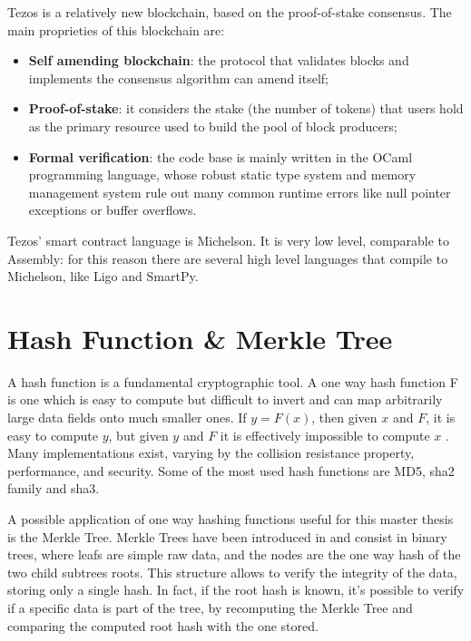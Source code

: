 Tezos \cite{allombert_introduction_2019} is a relatively new blockchain, based on the proof-of-stake consensus. The main proprieties of this blockchain are:
\begin{itemize}
      \item \textbf{Self amending blockchain}: the protocol that validates blocks and implements the consensus algorithm can amend itself;
            \vspace{-0.11in}
      \item \textbf{Proof-of-stake}: it considers the stake (the number of tokens) that users hold as the primary resource used to build the pool of block producers;
            \vspace{-0.11in}
      \item \textbf{Formal verification}: the code base is mainly written in the OCaml programming language, whose robust static type system and memory management system rule out many common runtime errors like null pointer exceptions or buffer overflows.
\end{itemize}

Tezos' smart contract language is Michelson. It is very low level, comparable to Assembly: for this reason there are several high level languages that compile to Michelson, like Ligo and SmartPy.

\section{Hash Function \& Merkle Tree}

A hash function is a fundamental cryptographic tool. A one way hash function F is one which is easy to compute but difficult to invert and can map arbitrarily large data fields onto much smaller ones. If $y = F(x)$, then given $x$ and $F$, it is easy to compute $y$, but given $y$ and $F$ it is effectively impossible to compute $x$ \cite{merkle_secrecy_1979}. Many implementations exist, varying by the collision resistance property, performance, and security. Some of the most used hash functions are MD5, sha2 family and sha3.

A possible application of one way hashing functions useful for this master thesis is the Merkle Tree. Merkle Trees have been introduced in \cite{merkle_secrecy_1979} and consist in binary trees, where leafs are simple raw data, and the nodes are the one way hash of the two child subtrees roots. This structure allows to verify the integrity of the data, storing only a single hash. In fact, if the root hash is known, it's possible to verify if a specific data is part of the tree, by recomputing the Merkle Tree and comparing the computed root hash with the one stored.


